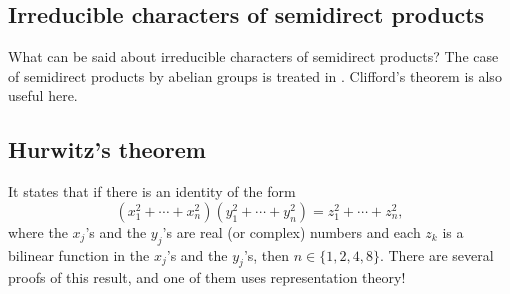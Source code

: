 \subsection*{Irreducible characters of semidirect products}

What can be said about irreducible characters
of semidirect products? The case of 
semidirect products by abelian groups is treated 
in \cite[Section 8.2]{MR0450380}. Clifford's theorem is also useful 
here. 

\subsection*{Hurwitz's theorem}

It states that 
if there is an identity of the form 
	\begin{equation*}
		(x_1^2+\cdots+x_n^2)(y_1^2+\cdots+y_n^2)=z_1^2+\cdots+z_n^2,
	\end{equation*}
	where the $x_j$'s and the $y_j$'s are real (or complex) numbers and
	each $z_k$ is a bilinear function in the $x_j$'s and the $y_j$'s, then 
	$n\in\{1,2,4,8\}$. There are several 
    proofs of this result, and one of them uses representation theory! 






